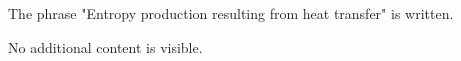 The phrase "Entropy production resulting from heat transfer" is written.  

No additional content is visible.
